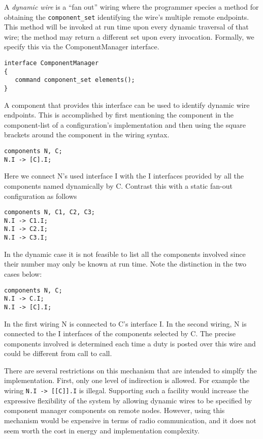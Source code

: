 A \textit{dynamic wire} is a ``fan out'' wiring where the programmer species a method for
obtaining the \texttt{component\_set} identifying the wire's multiple remote endpoints. This
method will be invoked at run time upon every dynamic traversal of that wire; the method may
return a different set upon every invocation. Formally, we specify this via the ComponentManager
interface.
\begin{verbatim}
interface ComponentManager
{ 
   command component_set elements();
}
\end{verbatim}

A component that provides this interface can be used to identify dynamic wire endpoints. This is
accomplished by first mentioning the component in the component-list of a configuration's
implementation and then using the square brackets around the component in the wiring syntax.

\begin{verbatim}
components N, C;
N.I -> [C].I;
\end{verbatim}

Here we connect N's used interface I with the I interfaces provided by all the components named
dynamically by C. Contrast this with a static fan-out configuration as follows

\begin{verbatim}
components N, C1, C2, C3;
N.I -> C1.I;
N.I -> C2.I;
N.I -> C3.I;
\end{verbatim}
    
In the dynamic case it is not feasible to list all the components involved since their number
may only be known at run time. Note the distinction in the two cases below:

\begin{verbatim}
components N, C;
N.I -> C.I;
N.I -> [C].I;
\end{verbatim}

In the first wiring N is connected to C's interface I. In the second wiring, N is connected to
the I interfaces of the components selected by C. The precise components involved is determined
each time a duty is posted over this wire and could be different from call to call.

There are several restrictions on this mechanism that are intended to simplfy the
implementation. First, only one level of indirection is allowed. For example the wiring
\texttt{N.I -> [[C]].I} is illegal. Supporting such a facility would increase the expressive
flexibility of the system by allowing dynamic wires to be specified by component manager
components on remote nodes. However, using this mechanism would be expensive in terms of radio
communication, and it does not seem worth the cost in energy and implementation complexity.

